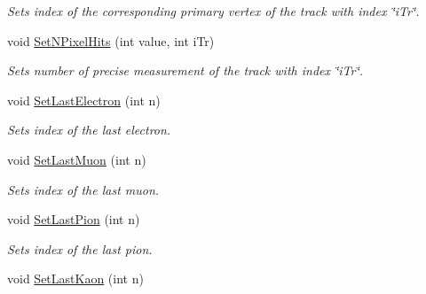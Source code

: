 \begin{DoxyCompactItemize}
\begin{DoxyCompactList}\small\item\em Sets index of the corresponding primary vertex of the track with index \char`\"{}i\+Tr\char`\"{}. \end{DoxyCompactList}\item 
void \hyperlink{classKFPTrackVector_a5e2ef983bab15ae84c99e110eb00f86f}{Set\+N\+Pixel\+Hits} (int value, int i\+Tr)\hypertarget{classKFPTrackVector_a5e2ef983bab15ae84c99e110eb00f86f}{}\label{classKFPTrackVector_a5e2ef983bab15ae84c99e110eb00f86f}

\begin{DoxyCompactList}\small\item\em Sets number of precise measurement of the track with index \char`\"{}i\+Tr\char`\"{}. \end{DoxyCompactList}\item 
void \hyperlink{classKFPTrackVector_a2e93dac1dd288927b14e0a8ad25c1846}{Set\+Last\+Electron} (int n)\hypertarget{classKFPTrackVector_a2e93dac1dd288927b14e0a8ad25c1846}{}\label{classKFPTrackVector_a2e93dac1dd288927b14e0a8ad25c1846}

\begin{DoxyCompactList}\small\item\em Sets index of the last electron. \end{DoxyCompactList}\item 
void \hyperlink{classKFPTrackVector_ae41a01b96345c8fa1416e25398c6d6c5}{Set\+Last\+Muon} (int n)\hypertarget{classKFPTrackVector_ae41a01b96345c8fa1416e25398c6d6c5}{}\label{classKFPTrackVector_ae41a01b96345c8fa1416e25398c6d6c5}

\begin{DoxyCompactList}\small\item\em Sets index of the last muon. \end{DoxyCompactList}\item 
void \hyperlink{classKFPTrackVector_a37488c3efa78e5a751b698db354346fe}{Set\+Last\+Pion} (int n)\hypertarget{classKFPTrackVector_a37488c3efa78e5a751b698db354346fe}{}\label{classKFPTrackVector_a37488c3efa78e5a751b698db354346fe}

\begin{DoxyCompactList}\small\item\em Sets index of the last pion. \end{DoxyCompactList}\item 
void \hyperlink{classKFPTrackVector_a6ef5c2f3cac8e908fcdde60014a09b55}{Set\+Last\+Kaon} (int n)\hypertarget{classKFPTrackVector_a6ef5c2f3cac8e908fcdde60014a09b55}{}\label{classKFPTrackVector_a6ef5c2f3cac8e908fcdde60014a09b55}


\end{DoxyCompactItemize}
